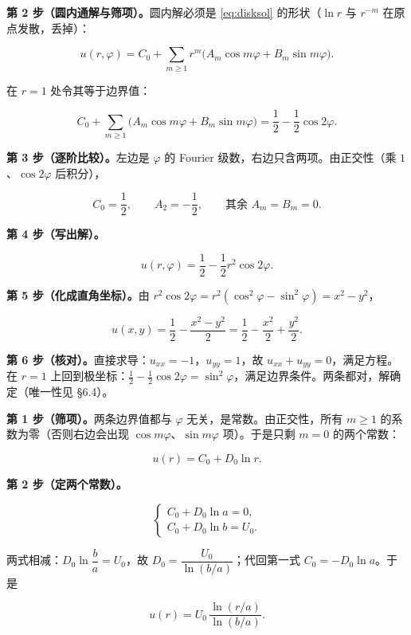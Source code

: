 \documentclass[11pt]{ctexart}
\begin{document}
\textbf{第 2 步（圆内通解与筛项）。}圆内解必须是 \eqref{eq:disksol} 的形状（$\ln r$ 与 $r^{-m}$ 在原点发散，丢掉）：

\[
u(r,\varphi)=C_0+\sum_{m\ge1}r^m\big(A_m\cos m\varphi+B_m\sin m\varphi\big).
\]

在 $r=1$ 处令其等于边界值：

\[
C_0+\sum_{m\ge1}\big(A_m\cos m\varphi+B_m\sin m\varphi\big)=\frac12-\frac12\cos2\varphi .
\]

\textbf{第 3 步（逐阶比较）。}左边是 $\varphi$ 的 Fourier 级数，右边只含两项。由正交性（乘 $1$、$\cos2\varphi$ 后积分），

\[
C_0=\frac12,\qquad A_2=-\frac12,\qquad \text{其余 }A_m=B_m=0 .
\]

\textbf{第 4 步（写出解）。}

\[
u(r,\varphi)=\frac12-\frac12r^2\cos2\varphi .
\]

\textbf{第 5 步（化成直角坐标）。}由 $r^2\cos2\varphi=r^2(\cos^2\varphi-\sin^2\varphi)=x^2-y^2$，

\[
u(x,y)=\frac12-\frac{x^2-y^2}{2}=\frac12-\frac{x^2}{2}+\frac{y^2}{2}.
\]

\textbf{第 6 步（核对）。}直接求导：$u_{xx}=-1$，$u_{yy}=1$，故 $u_{xx}+u_{yy}=0$，满足方程。在 $r=1$ 上回到极坐标：$\frac12-\frac12\cos2\varphi=\sin^2\varphi$，满足边界条件。两条都对，解确定（唯一性见 \S6.4）。



\textbf{第 1 步（筛项）。}两条边界值都与 $\varphi$ 无关，是常数。由正交性，所有 $m\ge1$ 的系数为零（否则右边会出现 $\cos m\varphi$、$\sin m\varphi$ 项）。于是只剩 $m=0$ 的两个常数：

\[
u(r)=C_0+D_0\ln r .
\]

\textbf{第 2 步（定两个常数）。}

\[
\begin{cases}
C_0+D_0\ln a=0,\\[2pt]
C_0+D_0\ln b=U_0 .
\end{cases}
\]

两式相减：$D_0\ln\dfrac{b}{a}=U_0$，故 $D_0=\dfrac{U_0}{\ln(b/a)}$；代回第一式 $C_0=-D_0\ln a$。于是

\[
u(r)=U_0\,\frac{\ln(r/a)}{\ln(b/a)} .
\]
\end{document}
